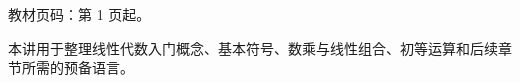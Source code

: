 
\begin{knowledgeBox}
教材页码：第 1 页起。

本讲用于整理线性代数入门概念、基本符号、数乘与线性组合、初等运算和后续章节所需的预备语言。
\end{knowledgeBox}
